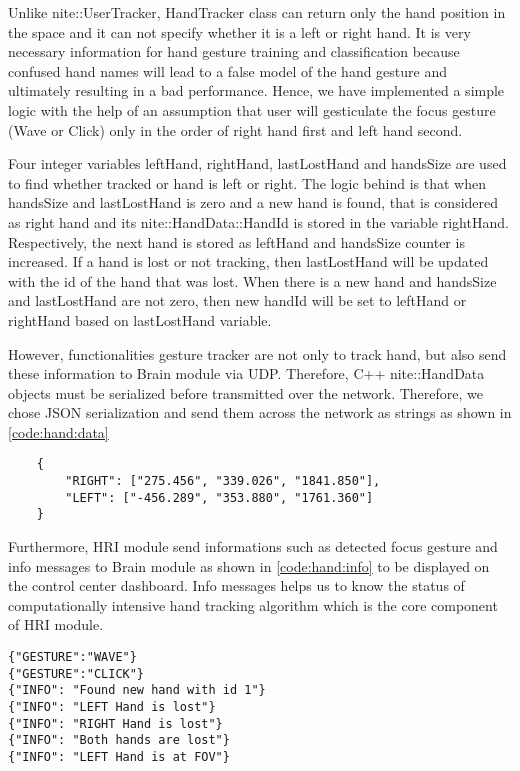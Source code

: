 Unlike nite::UserTracker, HandTracker class can return only the hand position in the space and it can not specify whether it is a left or right hand. It is very necessary information for hand gesture training and classification because confused hand names will lead to a false model of the hand gesture and ultimately resulting in a bad performance. Hence, we have implemented a simple logic with the help of an assumption that user will gesticulate the focus gesture (Wave or Click) only in the order of right hand first and left hand second. 

Four integer variables leftHand, rightHand, lastLostHand and handsSize are used to find whether tracked or hand is left or right. The logic behind is that when handsSize and lastLostHand is zero and a new hand is found, that is considered as right hand and its nite::HandData::HandId is stored in the variable rightHand. Respectively, the next hand is stored as leftHand and handsSize counter is increased. If a hand is lost or not tracking, then lastLostHand will be updated with the id of the hand that was lost. When there is a new hand and handsSize and lastLostHand are not zero, then new handId will be set to leftHand or rightHand based on lastLostHand variable.

However, functionalities gesture tracker are not only  to track hand, but also send these information to Brain module via UDP. Therefore, C++  nite::HandData objects must be serialized before transmitted over the network. Therefore, we chose JSON serialization and send them across the network as strings as shown in \ref{code:hand:data}

\begin{lstlisting}
	{
		"RIGHT": ["275.456", "339.026", "1841.850"], 
		"LEFT": ["-456.289", "353.880", "1761.360"]
	}
\end{lstlisting}
\label{code:hand:data}

Furthermore, HRI module send informations such as detected focus gesture and info messages to Brain module as shown in \ref{code:hand:info} to be displayed on the control center dashboard. Info messages helps us to know the status of computationally intensive hand tracking algorithm which is the core component of HRI module. 

\begin{lstlisting}
{"GESTURE":"WAVE"}
{"GESTURE":"CLICK"}
{"INFO": "Found new hand with id 1"}
{"INFO": "LEFT Hand is lost"}
{"INFO": "RIGHT Hand is lost"}
{"INFO": "Both hands are lost"}
{"INFO": "LEFT Hand is at FOV"}
\end{lstlisting}
\label{code:hand:info}

